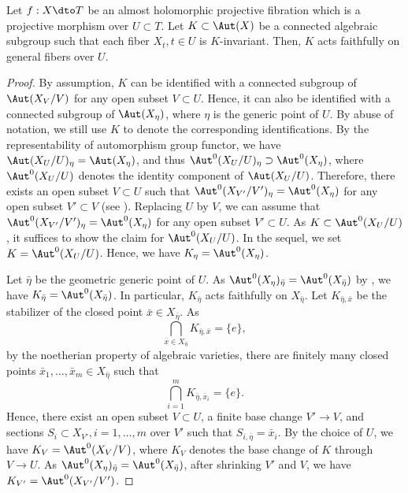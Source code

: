 \documentclass[11pt]{amsart}
\begin{document}
\begin{lemma}\label{lem: faithful on general fiber}
Let $f: X \dto T$ be an almost holomorphic projective fibration which is a projective morphism over $U\subset T$. Let $K \subset \Aut(X)$ be a connected algebraic subgroup such that each fiber $X_t, t\in U$ is $K$-invariant. Then, $K$ acts faithfully on general fibers over $U$.
\end{lemma}
\begin{proof}
By assumption, $K$ can be identified with a connected subgroup of $\Aut(X_V/V)$ for any open subset $V\subset U$. Hence, it can also be identified with a connected subgroup of $\Aut(X_\eta)$, where $\eta$ is the generic point of $U$. By abuse of notation, we still use $K$ to denote the corresponding identifications. By the representability of automorphism group functor, we have $\Aut(X_U/U)_\eta = \Aut(X_\eta)$, and thus $\Aut^0(X_U/U)_\eta \supset \Aut^0(X_\eta)$, where $\Aut^0(X_U/U)$ denotes the identity component of $\Aut(X_U/U)$. Therefore, there exists an open subset $V\subset U$ such that $\Aut^0(X_{V'}/V')_\eta =\Aut^0(X_\eta)$ for any open subset $V'\subset V$ (see \cite[\href{https://stacks.math.columbia.edu/tag/055H}{Lemma 055H}]{stacks-project}). Replacing $U$ by $V$, we can assume that $\Aut^0(X_{V'}/V')_\eta =\Aut^0(X_\eta)$ for any open subset $V'\subset U$. As $K \subset \Aut^0(X_U/U)$, it suffices to show the claim for $\Aut^0(X_U/U)$. In the sequel, we set $K=\Aut^0(X_U/U)$. Hence, we have $K_\eta = \Aut^0(X_\eta)$.  

Let $\bar\eta$ be the geometric generic point of $U$. As $\Aut^0(X_\eta)_{\bar\eta}=\Aut^0(X_{\bar\eta})$ by \cite[Lemma 9.5.1 (3)]{Kle05}, we have $K_{\bar\eta}=\Aut^0(X_{\bar\eta})$. In particular, $K_{\bar\eta}$ acts faithfully on $X_{\bar\eta}$. Let $K_{\bar\eta, \bar x}$ be the stabilizer of the closed point $\bar x \in X_{\bar\eta}$. As 
\[
\bigcap_{\bar x\in X_{\bar\eta}} K_{\bar\eta, \bar x} = \{e\},
\] by the noetherian property of algebraic varieties, there are finitely many closed points $\bar x_1, \ldots, \bar x_m \in X_{\bar\eta}$ such that 
\[
\bigcap_{i=1}^m K_{\bar\eta, \bar x_i} = \{e\}.
\] Hence, there exist an open subset $V\subset U$, a finite base change $V' \to V$, and sections $S_i \subset X_{V'}, i =1, \ldots, m$ over $V'$ such that $S_{i,\bar\eta} = \bar x_i$. By the choice of $U$, we have $K_V = \Aut^0(X_V/V)$, where $K_V$ denotes the base change of $K$ through $V \to U$. As $\Aut^0(X_\eta)_{\bar\eta}=\Aut^0(X_{\bar\eta})$, after shrinking $V'$ and $V$, we have $K_{V'} = \Aut^0(X_{V'}/V')$. 


\end{proof}
\end{document}
